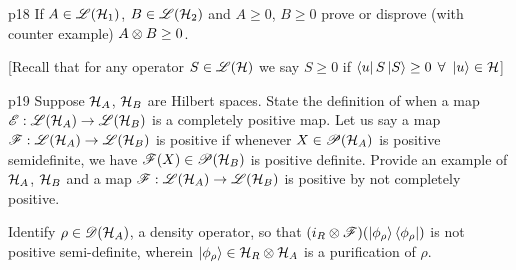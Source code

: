 \documentclass[a4paper, 11pt]{article}
\begin{document}

\begin{problem}{%
	}{p18%
	}
	If $A\in {\mathscr{L}}(\mathcal{H}_1)$, $B\in {\mathscr{L}}(\mathcal{H}_2)$ and $A\geq 0$, $B\geq 0$ prove or disprove (with counter example) $A\otimes B\geq 0$.
	
	[Recall that for any operator $S\in {\mathscr{L}}(\mathcal{H})$ we say $S\geq 0$ if $\bra{u}S\ket{S}\geq 0$ $\forall\ \ket{u}\in \mathcal{H}$]
\end{problem}


\begin{problem}{%
	}{p19%
	}
	Suppose $\mathcal{H}_A$, $\mathcal{H}_B$ are Hilbert spaces. State the definition of when a map ${\mathscr{E}}:{\mathscr{L}}(\mathcal{H}_A)\to {\mathscr{L}}(\mathcal{H}_B)$ is a completely positive map. Let us say a map ${\mathscr{F}}:{\mathscr{L}}(\mathcal{H}_A)\to {\mathscr{L}}(\mathcal{H}_B)$ is positive if whenever $X\in {\mathscr{P}}(\mathcal{H}_A)$ is positive semidefinite, we have ${\mathscr{F}}(X)\in {\mathscr{P}}(\mathcal{H}_B)$ is positive definite. Provide an example of $\mathcal{H}_A$, $\mathcal{H}_B$ and a map ${\mathscr{F}}:{\mathscr{L}}(\mathcal{H}_A)\to {\mathscr{L}}(\mathcal{H}_B)$ is positive by not completely positive.\parinn
	
	Identify $\rho\in {\mathscr{D}}(\mathcal{H}_A)$, a density operator, so that $(i_R\otimes {\mathscr{F}})(\ket{\phi_{\rho}}\bra{\phi_{\rho}})$ is not positive semi-definite, wherein $\ket{\phi_{\rho}}\in \mathcal{H}_R\otimes \mathcal{H}_A$ is a purification of $\rho$.
\end{problem}
\end{document}
